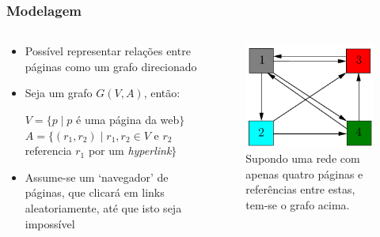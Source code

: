 \documentclass{beamer}
\begin{document}
\begin{frame}
    \frametitle{Modelagem}
    \begin{columns}[T]
        \begin{column}{.55\textwidth}
            \begin{itemize}
                \item Possível representar relações entre páginas como um
                    grafo direcionado
                \item Seja um grafo $G(V, A)$, então:
                \begin{center}
                    $V = \{p \mid p$ é uma página da web$\}$ \\
                    $A = \{(r_1, r_2) \mid r_1, r_2 \in V$ e $r_2$
                    referencia $r_1$ por um \textit{hyperlink}$\}$
                \end{center}
                \item Assume-se um `navegador' de páginas, que clicará em
                    links aleatoriamente, até que isto seja impossível
            \end{itemize}
        \end{column}
        \begin{column}{.4\textwidth}
        \begin{figure}
            \includegraphics[scale=0.45]{pr_1}
            \caption{\tiny{Supondo uma rede com apenas quatro páginas e
                referências entre estas, tem-se o grafo acima.}}
        \end{figure}
        \end{column}
    \end{columns}
\end{frame}
\end{document}
